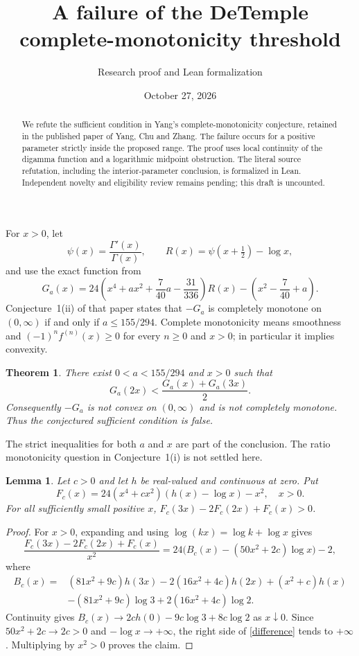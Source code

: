 \documentclass[11pt]{article}
\title{A failure of the DeTemple complete-monotonicity threshold}
\author{Research proof and Lean formalization}
\date{October 27, 2026}
\newtheorem{theorem}{Theorem}
\newtheorem{lemma}{Lemma}
\begin{document}
\maketitle
\begin{abstract}
We refute the sufficient condition in Yang's complete-monotonicity conjecture,
retained in the published paper of Yang, Chu and Zhang. The failure occurs for
a positive parameter strictly inside the proposed range. The proof uses local
continuity of the digamma function and a logarithmic midpoint obstruction.
The literal source refutation, including the interior-parameter conclusion, is
formalized in Lean. Independent novelty and eligibility review remains pending;
this draft is uncounted.
\end{abstract}

For $x>0$, let
\[
 \psi(x)=\frac{\Gamma'(x)}{\Gamma(x)},\qquad
 R(x)=\psi(x+\tfrac12)-\log x,
\]
and use the exact function from \cite[eq.~(3.3)]{Yang}
\[
 G_a(x)=24\left(x^4+ax^2+\frac7{40}a-\frac{31}{336}\right)R(x)
          -\left(x^2-\frac7{40}+a\right).
\]
Conjecture~1(ii) of that paper states that $-G_a$ is completely monotone on
$(0,\infty)$ if and only if $a\le155/294$. Complete monotonicity means smoothness
and $(-1)^nf^{(n)}(x)\ge0$ for every $n\ge0$ and $x>0$; in particular it implies
convexity.

\begin{theorem}\label{counter}
There exist $0<a<155/294$ and $x>0$ such that
\[
 G_a(2x)<\frac{G_a(x)+G_a(3x)}2.
\]
Consequently $-G_a$ is not convex on $(0,\infty)$ and is not completely monotone.
Thus the conjectured sufficient condition is false.
\end{theorem}

The strict inequalities for both $a$ and $x$ are part of the conclusion. The ratio
monotonicity question in Conjecture~1(i) is not settled here.

\begin{lemma}\label{local}
Let $c>0$ and let $h$ be real-valued and continuous at zero. Put
\[
 F_c(x)=24(x^4+cx^2)(h(x)-\log x)-x^2,\quad x>0.
\]
For all sufficiently small positive $x$,
$F_c(3x)-2F_c(2x)+F_c(x)>0$.
\end{lemma}
\begin{proof}
For $x>0$, expanding and using $\log(kx)=\log k+\log x$ gives
\begin{equation}\label{difference}
 \frac{F_c(3x)-2F_c(2x)+F_c(x)}{x^2}
 =24\bigl(B_c(x)-(50x^2+2c)\log x\bigr)-2,
\end{equation}
where
\begin{align*}
 B_c(x)={}&(81x^2+9c)h(3x)-2(16x^2+4c)h(2x)+(x^2+c)h(x)\\
          &-(81x^2+9c)\log3+2(16x^2+4c)\log2.
\end{align*}
Continuity gives
$B_c(x)\to2ch(0)-9c\log3+8c\log2$ as $x\downarrow0$.
Since $50x^2+2c\to2c>0$ and $-\log x\to+\infty$, the right side of
\eqref{difference} tends to $+\infty$. Multiplying by $x^2>0$ proves the claim.
\end{proof}
\end{document}
